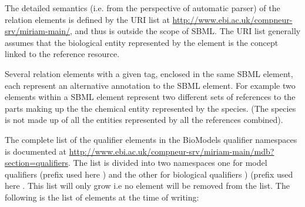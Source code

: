 The detailed semantics (i.e. from the perspective of automatic
parser) of the relation elements is defined by the URI list at
\url{http://www.ebi.ac.uk/compneur-srv/miriam-main/}, and thus is outside the
scope of SBML. The URI list generally assumes that the biological
entity represented by the element is the concept linked to the
reference resource.

Several relation elements with a given tag, enclosed in the same
SBML element, each represent an alternative annotation to the SBML
element. For example two  elements within a
\Species SBML element represent two different sets of
references to the parts making up the the chemical entity
represented by the species. (The species is not made up of all the
entities represented by all the references combined).

The complete list of the qualifier elements in the BioModels
qualifier namespaces is documented at
\url{http://www.ebi.ac.uk/compneur-srv/miriam-main/mdb?section=qualifiers}. The list is
divided into two namespaces one for model qualifiers
 (prefix used here
) and the other for biological qualifiers
) (prefix used here
.  This list will only grow i.e no element will be
removed from the list. The following is the list of elements at
the time of writing:


